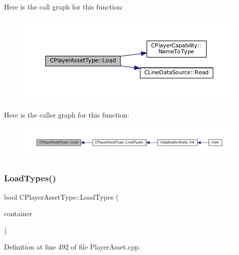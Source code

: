 Here is the call graph for this function\+:\nopagebreak
\begin{figure}[H]
\begin{center}
\leavevmode
\includegraphics[width=350pt]{classCPlayerAssetType_a8e50738b1b451f4c870108777e6e3f90_cgraph}
\end{center}
\end{figure}
Here is the caller graph for this function\+:\nopagebreak
\begin{figure}[H]
\begin{center}
\leavevmode
\includegraphics[width=350pt]{classCPlayerAssetType_a8e50738b1b451f4c870108777e6e3f90_icgraph}
\end{center}
\end{figure}
\hypertarget{classCPlayerAssetType_ad36348338ae4fea7e70450ef30c92a26}{}\label{classCPlayerAssetType_ad36348338ae4fea7e70450ef30c92a26} 
\subsubsection{\texorpdfstring{Load\+Types()}{LoadTypes()}}
{\footnotesize\ttfamily bool C\+Player\+Asset\+Type\+::\+Load\+Types (\begin{DoxyParamCaption}\item[{std\+::shared\+\_\+ptr$<$ \hyperlink{classCDataSourceContainer}{C\+Data\+Source\+Container} $>$}]{container }\end{DoxyParamCaption})\hspace{0.3cm}{\ttfamily [static]}}



Definition at line 492 of file Player\+Asset.\+cpp.



